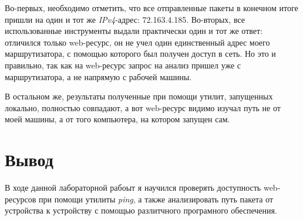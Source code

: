 \documentclass[a4paper]{article}
\begin{document}
  Во-первых, необходимо отметить, что все отправленные пакеты в конечном итоге пришли на один
  и тот же \textit{IPv4}-адрес: 72.163.4.185. Во-вторых, все использованные инструменты выдали 
  практически один и тот же ответ: отличился только web-ресурс, он не учел один единственный адрес моего маршрутизатора,
  с помощью которого был получен доступ в сеть. Но это и правильно, так как на web-ресурс запрос на анализ пришел уже
  с маршрутизатора, а не напрямую с рабочей машины.

  В остальном же, результаты полученные при помощи утилит, запущенных локально, полностью совпадают,
  а вот web-ресурс видимо  изучал путь не от моей машины, а от того компьютера, на котором запущен сам.

  \newpage
  \section{Вывод}

  В ходе данной лабораторной рабоыт я научился проверять доступность web-ресурсов при помощи утилиты \textit{ping},
  а также анализировать путь пакета от устройства к устройству с помощью разлитчного програмного обеспечения.
  
\end{document}
